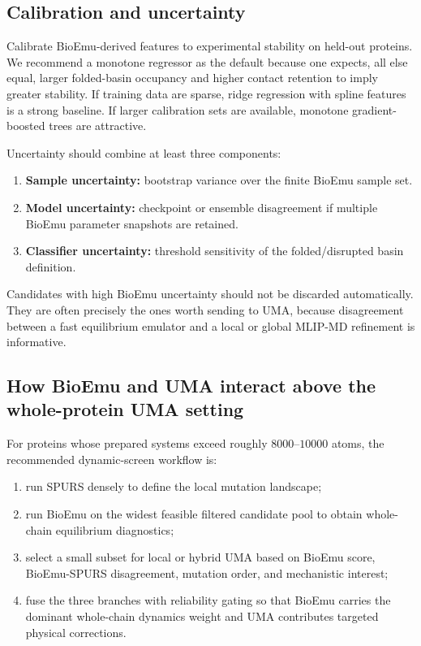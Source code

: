 \documentclass[11pt]{article}
\begin{document}
	\subsection{Calibration and uncertainty}
	
	Calibrate BioEmu-derived features to experimental stability on held-out proteins. We recommend a monotone regressor as the default because one expects, all else equal, larger folded-basin occupancy and higher contact retention to imply greater stability. If training data are sparse, ridge regression with spline features is a strong baseline. If larger calibration sets are available, monotone gradient-boosted trees are attractive.
	
	Uncertainty should combine at least three components:
	\begin{enumerate}[leftmargin=1.5em]
		\item \textbf{Sample uncertainty:} bootstrap variance over the finite BioEmu sample set.
		\item \textbf{Model uncertainty:} checkpoint or ensemble disagreement if multiple BioEmu parameter snapshots are retained.
		\item \textbf{Classifier uncertainty:} threshold sensitivity of the folded/disrupted basin definition.
	\end{enumerate}
	Candidates with high BioEmu uncertainty should not be discarded automatically. They are often precisely the ones worth sending to UMA, because disagreement between a fast equilibrium emulator and a local or global MLIP-MD refinement is informative.
	
	\subsection{How BioEmu and UMA interact above the whole-protein UMA setting}
	
	For proteins whose prepared systems exceed roughly $8000$--$10000$ atoms, the recommended dynamic-screen workflow is:
	\begin{enumerate}[leftmargin=1.5em]
		\item run SPURS densely to define the local mutation landscape;
		\item run BioEmu on the widest feasible filtered candidate pool to obtain whole-chain equilibrium diagnostics;
		\item select a small subset for local or hybrid UMA based on BioEmu score, BioEmu-SPURS disagreement, mutation order, and mechanistic interest;
		\item fuse the three branches with reliability gating so that BioEmu carries the dominant whole-chain dynamics weight and UMA contributes targeted physical corrections.
	\end{enumerate}
	
\end{document}
